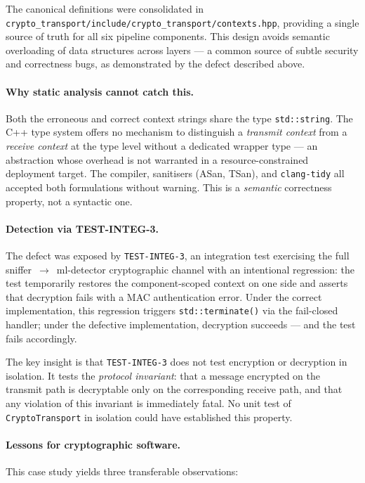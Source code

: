 \documentclass[11pt,a4paper]{article}
\begin{document}
    The canonical definitions were consolidated in
    \texttt{crypto\_transport/include/crypto\_transport/contexts.hpp},
    providing a single source of truth for all six pipeline components.
    This design avoids semantic overloading of data structures across layers ---
    a common source of subtle security and correctness bugs, as demonstrated by
    the defect described above.

    \paragraph{Why static analysis cannot catch this.}
    Both the erroneous and correct context strings share the type
    \texttt{std::string}. The C++ type system offers no mechanism to distinguish
    a \emph{transmit context} from a \emph{receive context} at the type level
    without a dedicated wrapper type --- an abstraction whose overhead is not
    warranted in a resource-constrained deployment target. The compiler,
    sanitisers (ASan, TSan), and \texttt{clang-tidy} all accepted both
    formulations without warning. This is a \emph{semantic} correctness
    property, not a syntactic one.

    \paragraph{Detection via TEST-INTEG-3.}
    The defect was exposed by \texttt{TEST-INTEG-3}, an integration test
    exercising the full sniffer~$\to$~ml-detector cryptographic channel with an
    intentional regression: the test temporarily restores the component-scoped
    context on one side and asserts that decryption fails with a MAC
    authentication error. Under the correct implementation, this regression
    triggers \texttt{std::terminate()} via the fail-closed handler; under the
    defective implementation, decryption succeeds --- and the test fails
    accordingly.

    The key insight is that \texttt{TEST-INTEG-3} does not test encryption or
    decryption in isolation. It tests the \emph{protocol invariant}: that a
    message encrypted on the transmit path is decryptable only on the
    corresponding receive path, and that any violation of this invariant is
    immediately fatal. No unit test of \texttt{CryptoTransport} in isolation
    could have established this property.

    \paragraph{Lessons for cryptographic software.}
    This case study yields three transferable observations:
\end{document}
